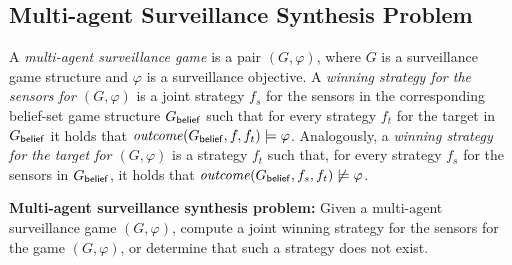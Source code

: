 

\subsection{Multi-agent Surveillance Synthesis Problem}
A \emph{multi-agent surveillance game} is a pair $(G,\varphi)$, where $G$ is a surveillance game structure and $\varphi$ is a surveillance objective. A \emph{winning strategy for the sensors for $(G,\varphi)$} is a joint strategy $f_s$ for the sensors in the corresponding belief-set game structure $G_{\mathsf{belief}}$ such that for every strategy $f_t$ for the target in $G_{\mathsf{belief}}$ it holds that $\mathit{outcome}(G_{\mathsf{belief}},f,f_t) \models \varphi$. Analogously, a \emph{winning strategy for the target for $(G,\varphi)$} is a strategy $f_t$ such that, for every strategy $f_s$ for the sensors in $G_{\mathsf{belief}}$, it holds that $\mathit{outcome}(G_{\mathsf{belief}},f_s,f_t) \not\models \varphi$.

{\bf Multi-agent surveillance synthesis problem:} Given a multi-agent surveillance game $(G,\varphi)$, compute a joint winning strategy for the sensors for the game $(G,\varphi)$, or determine that such a strategy does not exist.

